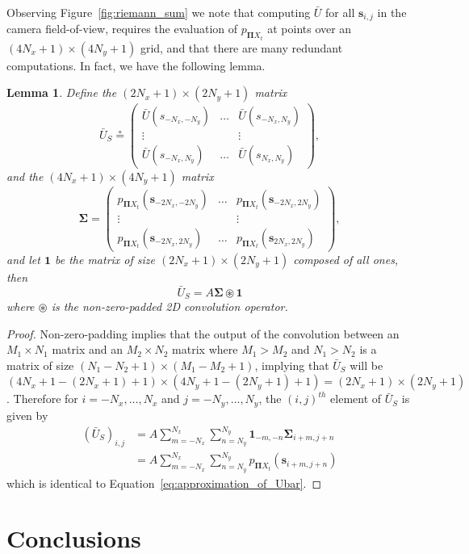\documentclass{article}
\newtheorem{lemma}[theorem]{Lemma}
\newcommand{\defeq}{\circeq}
\newcommand{\sbf}{\mathbf{s}}
\newcommand{\onebf}{\mathbf{1}}
\newcommand{\Pibf}{\boldsymbol{\Pi}}
\newcommand{\Sigmabf}{\boldsymbol{\Sigma}}
\begin{document}
Observing Figure~\ref{fig:riemann_sum} we note that computing $\bar{U}$ for all $\sbf_{i,j}$ in the camera field-of-view, requires the evaluation of $p_{\Pibf X_t}$ at points over an $(4N_x+1)\times(4N_y+1)$ grid, and that there are many redundant computations.  In fact, we have the following lemma.
\begin{lemma}
	Define the $(2N_x+1)\times(2N_y+1)$ matrix
	\[
	\bar{U}_S \defeq \begin{pmatrix}
						 \bar{U}(s_{-N_x,-N_y}) & \dots & \bar{U}(s_{-N_x,N_y}) \\
						 \vdots & & \vdots \\
						 \bar{U}(s_{-N_x,N_y}) & \dots & \bar{U}(s_{N_x,N_y})
                      \end{pmatrix},
	\]
	and the $(4N_x+1)\times(4N_y+1)$ matrix
	\[
		\Sigmabf = \begin{pmatrix}  p_{\Pibf X_t}(\sbf_{-2N_x,-2N_y}) & \dots & p_{\Pibf X_t}(\sbf_{-2N_x,2N_y}) \\
                                    \vdots & & \vdots \\	
                                    p_{\Pibf X_t}(\sbf_{-2N_x,2N_y}) & \dots & p_{\Pibf X_t}(\sbf_{2N_x,2N_y})
                   \end{pmatrix},
	\]
	and let $\onebf$ be the matrix of size $(2N_x+1)\times(2N_y+1)$ composed of all ones, then
	\[
	\bar{U}_S = A \Sigmabf \circledast \onebf
	\]
	where $\circledast$ is the non-zero-padded 2D convolution operator.
\end{lemma}
\begin{proof}
Non-zero-padding implies that the output of the convolution 	between an $M_1\times N_1$ matrix and an $M_2\times N_2$ matrix where $M_1>M_2$ and $N_1>N_2$ is a matrix of size $(N_1-N_2+1)\times(M_1-M_2+1)$, implying that $\bar{U}_S$ will be $(4N_x+1-(2N_x+1)+1)\times(4N_y+1-(2N_y+1)+1) = (2N_x+1)\times(2N_y+1)$.  Therefore for $i=-N_x,\dots,N_x$ and $j=-N_y,\dots,N_y$, the $(i,j)^{th}$ element of $\bar{U}_S$ is given by
	\begin{align*}
	(\bar{U}_S)_{i,j} &= A \sum_{m=-N_x}^{N_x} \sum_{n=N_y}^{N_y} \onebf_{-m,-n} \Sigmabf_{i+m, j+n} \\
	                  &= A \sum_{m=-N_x}^{N_x} \sum_{n=N_y}^{N_y} p_{\Pibf X_t}(\sbf_{i+m, j+n})
	\end{align*}
	which is identical to Equation~\eqref{eq:approximation_of_Ubar}.
\end{proof}




   
\section{Conclusions}
\label{sec:conclusion}




\end{document}
